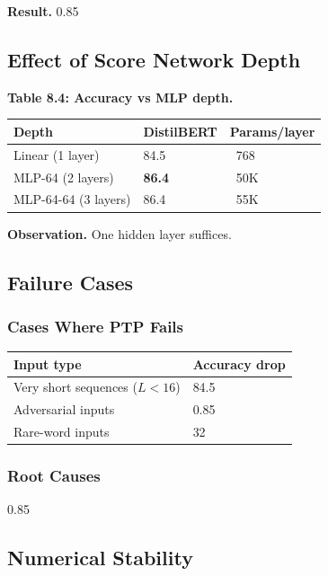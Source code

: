 \textbf{Result.} 0.85

\subsection{Effect of Score Network Depth}

\textbf{Table 8.4: Accuracy vs MLP depth.}

\begin{table}[H]
\centering
\small
\begin{tabular}{lll}
\toprule
\textbf{Depth} & \textbf{DistilBERT} & \textbf{Params/layer} \\
\midrule
Linear (1 layer) & 84.5 & ~768 \\
MLP-64 (2 layers) & \textbf{86.4} & ~50K \\
MLP-64-64 (3 layers) & 86.4 & ~55K \\
\bottomrule
\end{tabular}
\end{table}

\textbf{Observation.} One hidden layer suffices.

\subsection{Failure Cases}

\subsubsection{Cases Where PTP Fails}

\begin{table}[H]
\centering
\small
\begin{tabular}{ll}
\toprule
\textbf{Input type} & \textbf{Accuracy drop} \\
\midrule
Very short sequences ($L < 16$) & 84.5 \\
Adversarial inputs & 0.85 \\
Rare-word inputs & 32 \\
\bottomrule
\end{tabular}
\end{table}

\subsubsection{Root Causes}

0.85

\subsection{Numerical Stability}

